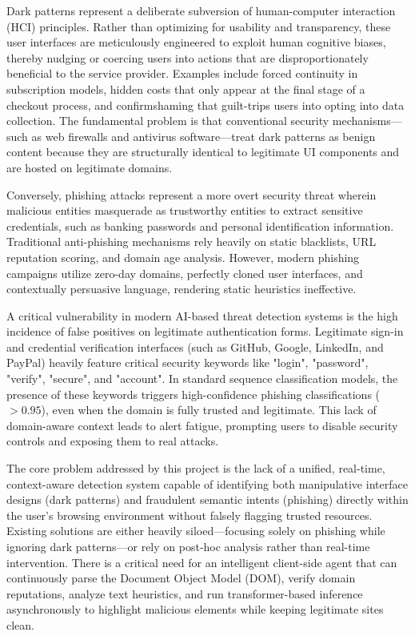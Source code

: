 \documentclass[12pt,a4paper]{report}
\begin{document}
Dark patterns represent a deliberate subversion of human-computer interaction (HCI) principles. Rather than optimizing for usability and transparency, these user interfaces are meticulously engineered to exploit human cognitive biases, thereby nudging or coercing users into actions that are disproportionately beneficial to the service provider. Examples include forced continuity in subscription models, hidden costs that only appear at the final stage of a checkout process, and confirmshaming that guilt-trips users into opting into data collection. The fundamental problem is that conventional security mechanisms—such as web firewalls and antivirus software—treat dark patterns as benign content because they are structurally identical to legitimate UI components and are hosted on legitimate domains.

Conversely, phishing attacks represent a more overt security threat wherein malicious entities masquerade as trustworthy entities to extract sensitive credentials, such as banking passwords and personal identification information. Traditional anti-phishing mechanisms rely heavily on static blacklists, URL reputation scoring, and domain age analysis. However, modern phishing campaigns utilize zero-day domains, perfectly cloned user interfaces, and contextually persuasive language, rendering static heuristics ineffective.

A critical vulnerability in modern AI-based threat detection systems is the high incidence of false positives on legitimate authentication forms. Legitimate sign-in and credential verification interfaces (such as GitHub, Google, LinkedIn, and PayPal) heavily feature critical security keywords like "login", "password", "verify", "secure", and "account". In standard sequence classification models, the presence of these keywords triggers high-confidence phishing classifications ($>0.95$), even when the domain is fully trusted and legitimate. This lack of domain-aware context leads to alert fatigue, prompting users to disable security controls and exposing them to real attacks.

The core problem addressed by this project is the lack of a unified, real-time, context-aware detection system capable of identifying both manipulative interface designs (dark patterns) and fraudulent semantic intents (phishing) directly within the user's browsing environment without falsely flagging trusted resources. Existing solutions are either heavily siloed—focusing solely on phishing while ignoring dark patterns—or rely on post-hoc analysis rather than real-time intervention. There is a critical need for an intelligent client-side agent that can continuously parse the Document Object Model (DOM), verify domain reputations, analyze text heuristics, and run transformer-based inference asynchronously to highlight malicious elements while keeping legitimate sites clean.
\end{document}
